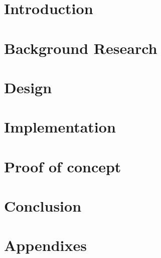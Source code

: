 \documentclass[]{report}
\begin{document}
\graphicspath{{img/}{../img/}}





\chapter{Introduction}


\chapter{Background Research}


\chapter{Design}


\chapter{Implementation}


\chapter{Proof of concept}


\chapter{Conclusion}




\chapter{Appendixes}

\end{document}
